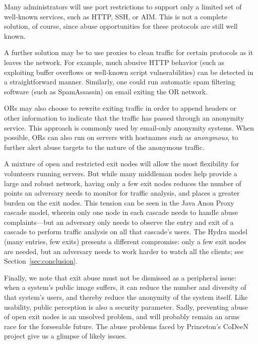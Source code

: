 \documentclass[times,10pt,twocolumn]{article}
\begin{document}

Many administrators will use port restrictions to support only a
limited set of well-known services, such as HTTP, SSH, or AIM.
This is not a complete solution, of course, since abuse opportunities for these
protocols are still well known.

A further solution may be to use proxies to clean traffic for certain
protocols as it leaves the network.  For example, much abusive HTTP
behavior (such as exploiting buffer overflows or well-known script
vulnerabilities) can be detected in a straightforward manner.
Similarly, one could run automatic spam filtering software (such as
SpamAssassin) on email exiting the OR network.

ORs may also choose to rewrite exiting traffic in order to append
headers or other information to indicate that the traffic has passed
through an anonymity service.  This approach is commonly used
by email-only anonymity systems.  When possible, ORs can also
run on servers with hostnames such as {\it anonymous}, to further
alert abuse targets to the nature of the anonymous traffic.

A mixture of open and restricted exit nodes will allow the most
flexibility for volunteers running servers. But while many
middleman nodes help provide a large and robust network,
having only a few exit nodes reduces the number of points
an adversary needs to monitor for traffic analysis, and places a
greater burden on the exit nodes.  This tension can be seen in the
Java Anon Proxy
cascade model, wherein only one node in each cascade needs to handle
abuse complaints---but an adversary only needs to observe the entry
and exit of a cascade to perform traffic analysis on all that
cascade's users. The Hydra model (many entries, few exits) presents a
different compromise: only a few exit nodes are needed, but an
adversary needs to work harder to watch all the clients; see
Section~\ref{sec:conclusion}.

Finally, we note that exit abuse must not be dismissed as a peripheral
issue: when a system's public image suffers, it can reduce the number
and diversity of that system's users, and thereby reduce the anonymity
of the system itself.  Like usability, public perception is also a
security parameter.  Sadly, preventing abuse of open exit nodes is an
unsolved problem, and will probably remain an arms race for the
forseeable future.  The abuse problems faced by Princeton's CoDeeN
project \cite{darkside} give us a glimpse of likely issues.
\end{document}
